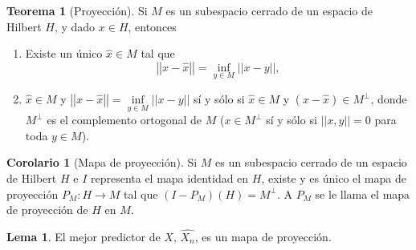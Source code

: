 \documentclass[11pt,letterpaper]{article}
\newcommand{\norm}[1]{\ensuremath{\left|\left|#1\right|\right|}}
\theoremstyle{definition}
\theoremstyle{theorem}
\newtheorem{theorem}[definition]{Teorema}
\newtheorem{lemma}[definition]{Lema}
\newtheorem{corollary}[definition]{Corolario}
\theoremstyle{remark}
\begin{document}
	\begin{theorem}[Proyección] \label{teoremaProy}
		Si \(M\) es un subespacio cerrado de un espacio de Hilbert \(H\), y dado \(x\in H\), entonces
		\begin{enumerate}
			\item Existe un único \(\hat{x}\in M\) tal que \[\norm{x-\hat{x}}=\underset{y\in M}{\inf}\norm{x-y},\]
			\item \(\hat{x}\in M\) y \(\norm{x-\hat{x}}=\underset{y\in M}{\inf}\norm{x-y}\) sí y sólo si \(\hat{x}\in M\) y \(\left(x-\hat{x}\right)\in M^{\perp}\), donde \(M^{\perp}\) es el complemento ortogonal de \(M\) (\(x \in M^{\perp}\) sí y sólo si \(\norm{x,y}=0\) para toda \(y\in M\)).
		\end{enumerate}
	\end{theorem}
	\begin{corollary}[Mapa de proyección] \label{coroProy}
		Si \(M\) es un subespacio cerrado de un espacio de Hilbert \(H\) e \(I\) representa el mapa identidad en \(H\), existe y es único el mapa de proyección \(P_M:H\to M\) tal que \((I-P_M)(H)=M^{\perp}\). A \(P_M\) se le llama el mapa de proyección de \(H\) en \(M\).
	\end{corollary}
	\begin{lemma} \label{lemaProy}
		El mejor predictor de \(X\), \(\hat{X_n}\), es un mapa de proyección.
	\end{lemma}
\end{document}
